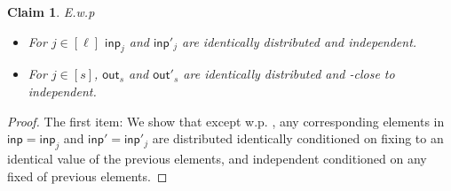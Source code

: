 \documentclass[11pt]{article}
\numberwithin{equation}{section} %
\numberwithin{figure}{section} %
\newtheorem{claim}[thm]{Claim}
\newcommand{\inp}{\ensuremath{\mathsf{inp}}\xspace}
\newcommand{\out}{\ensuremath{\mathsf{out}}\xspace}
\begin{document}
\begin{claim}\label{clm:inps-outs-areind}
E.w.p \negl
 \begin{itemize}
  \item For $j\in [\ell]$ $\inp_j$ and $\inp'_j$ are identically distributed and independent.
  \item For $j\in [s]$, $\out_s$ and $\out'_s$ are identically distributed and \negl-close to independent.
 \end{itemize}

\end{claim}
\begin{proof}
 The first item:
We show that except w.p. \negl, any corresponding elements in $\inp =\inp_j$ and $\inp' = \inp'_j$ are distributed identically conditioned on fixing to an identical value of the previous elements, and independent conditioned on any fixed of previous elements.
 

\end{proof}
\end{document}
